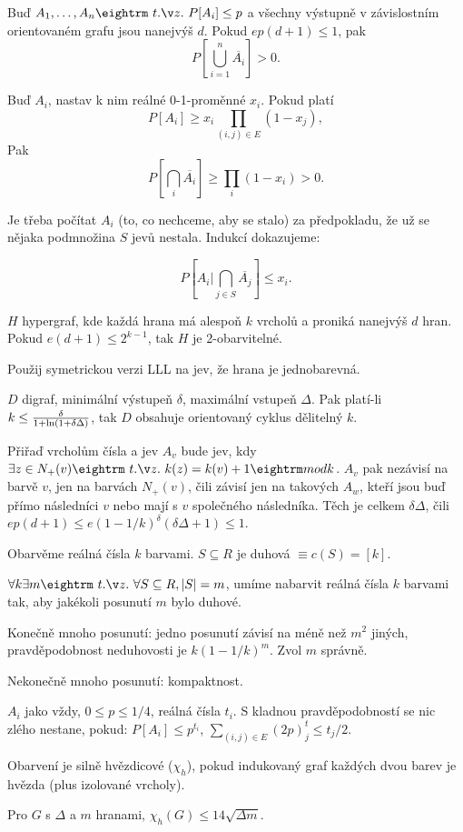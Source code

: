
 Buď $A_1, \dots, A_n \st P[A_i] \le p$ a všech\-ny vý\-stup\-ně v zá\-vi\-slostním
orientovaném grafu jsou nanejvýš $d$. Pokud $ep(d+1) \le 1$, pak 
$$P[\bigcup_{i=1}^n \overline{A_i}] > 0.$$

\prf{} Buď $A_i$, nastav k nim reálné 0-1-proměnné $x_i$. Pokud platí
$$P[A_i] \ge x_i \prod_{(i,j) \in E} (1-x_j), $$
Pak
$$P[\bigcap_i \overline{A_i}] \ge \prod_i (1-x_i) > 0.$$

\prf{} Je třeba počítat $A_i$ (to, co nechceme, aby se stalo) za předpokladu, že
už se nějaka podmnožina $S$ jevů nestala. Indukcí dokazujeme:

$$ P[A_i|\bigcap_{j \in S} \overline{A_j}] \le x_i.$$


 $H$ hypergraf, kde každá hrana má alespoň $k$ vrcholů
a proniká nanejvýš $d$ hran. Pokud $e(d+1) \le 2^{k-1}$, tak $H$ je 2-obarvitelné.

\prf{} Použij symetrickou verzi LLL na jev, že hrana je jednobarevná.

 $D$ digraf, minimální výstupeň $\delta$, maximální vstupeň
$\Delta$. Pak platí-li $k \le {\delta \over 1 + \ln(1+\delta\Delta)}$, tak $D$ obsahuje
orientovaný cyklus dělitelný $k$.

\prf{} Přiřaď vrcholům čísla a jev $A_v$ bude jev, kdy $\exists z \in N_+(v) \st k(z) = k(v) +1 \mod k$.
$A_v$ pak nezávisí na barvě $v$, jen na barvách $N_+(v)$, čili závisí jen na takových $A_w$, kteří jsou
buď přímo následníci $v$ nebo mají s $v$ společného následníka. Těch je celkem $\delta \Delta$, čili
$ep(d+1) \le e(1-1/k)^\delta (\delta \Delta + 1) \le 1$.

\dfn{} Obarvěme reálná čísla $k$ barvami. $S \subseteq R$ je {\I duhová} $\equiv c(S) = [k]$.

\thm{} $\forall k \exists m \st \forall S \subseteq R, |S|=m$, umíme nabarvit
reálná čísla $k$ barvami tak, aby jakékoli posunutí $m$ bylo duhové.

\prf{} Konečně mnoho posunutí: jedno posunutí závisí na méně než $m^2$ jiných, 
pravděpodobnost neduhovosti je $k(1-1/k)^m$. Zvol $m$ správně.

Nekonečně mnoho posunutí: kompaktnost.

 $A_i$ jako vždy, $0 \le p \le 1/4$, reálná čísla $t_i$.
S kladnou pravděpodobností se nic zlého nestane, pokud:
\itemize\ibull
\: $P[A_i] \le p^{t_i}$,
\: $\sum_{(i,j) \in E} (2p)^t_j \le t_j /2$.
\endlist

\dfn{} Obarvení je {\I silně hvězdicové} ($\chi_h$), pokud indukovaný graf každých dvou barev
je hvězda (plus izolované vrcholy).

\thm{} Pro $G$ s $\Delta$ a $m$ hranami, $\chi_h(G) \le 14 \sqrt{\Delta m}$.

\prf{} 


\bye
